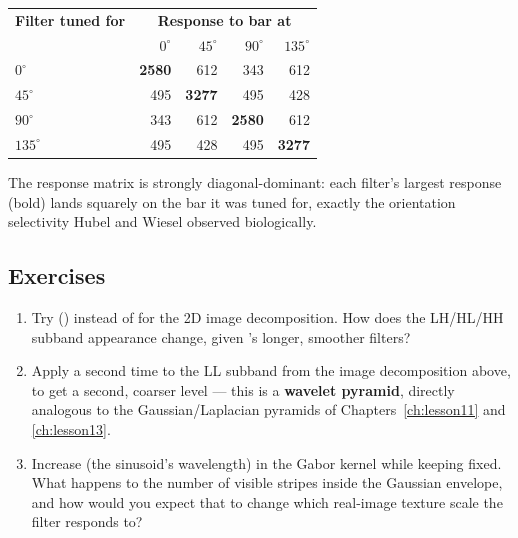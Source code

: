 \begin{center}
\renewcommand{\arraystretch}{1.3}
\begin{tabular}{lrrrr}
\hline
\textbf{Filter tuned for} & \multicolumn{4}{c}{\textbf{Response to bar at}} \\
 & $0^\circ$ & $45^\circ$ & $90^\circ$ & $135^\circ$ \\
\hline
$0^\circ$   & \textbf{2580} & 612 & 343 & 612 \\
$45^\circ$  & 495 & \textbf{3277} & 495 & 428 \\
$90^\circ$  & 343 & 612 & \textbf{2580} & 612 \\
$135^\circ$ & 495 & 428 & 495 & \textbf{3277} \\
\hline
\end{tabular}
\end{center}

The response matrix is strongly diagonal-dominant: each filter's largest response (bold) lands squarely on the bar it was tuned for, exactly the orientation selectivity Hubel and Wiesel observed biologically.

\subsection*{Exercises}
\begin{enumerate}
  \item Try  () instead of  for the 2D image decomposition. How does the LH/HL/HH subband appearance change, given 's longer, smoother filters?
  \item Apply  a second time to the LL subband from the image decomposition above, to get a second, coarser level --- this is a \textbf{wavelet pyramid}, directly analogous to the Gaussian/Laplacian pyramids of Chapters~\ref{ch:lesson11} and \ref{ch:lesson13}.
  \item Increase  (the sinusoid's wavelength) in the Gabor kernel while keeping  fixed. What happens to the number of visible stripes inside the Gaussian envelope, and how would you expect that to change which real-image texture scale the filter responds to?
\end{enumerate}

\vfill
{}
